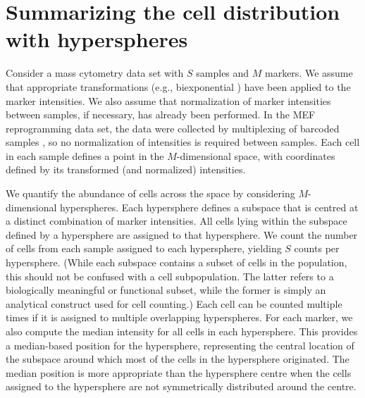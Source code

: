 \documentclass{article}
\begin{document}
\section{Summarizing the cell distribution with hyperspheres}
Consider a mass cytometry data set with $S$ samples and $M$ markers.
We assume that appropriate transformations (e.g., biexponential \cite{parks2006new}) have been applied to the marker intensities.
We also assume that normalization of marker intensities between samples, if necessary, has already been performed.
In the MEF reprogramming data set, the data were collected by multiplexing of barcoded samples \cite{zunder2015palladium}, so no normalization of intensities is required between samples.
Each cell in each sample defines a point in the $M$-dimensional space, with coordinates defined by its transformed (and normalized) intensities.

We quantify the abundance of cells across the space by considering $M$-dimensional hyperspheres.
Each hypersphere defines a subspace that is centred at a distinct combination of marker intensities.
All cells lying within the subspace defined by a hypersphere are assigned to that hypersphere.
We count the number of cells from each sample assigned to each hypersphere, yielding $S$ counts per hypersphere.
(While each subspace contains a subset of cells in the population, this should not be confused with a cell subpopulation.
The latter refers to a biologically meaningful or functional subset, while the former is simply an analytical construct used for cell counting.)
Each cell can be counted multiple times if it is assigned to multiple overlapping hyperspheres.
For each marker, we also compute the median intensity for all cells in each hypersphere.
This provides a median-based position for the hypersphere, representing the central location of the subspace around which most of the cells in the hypersphere originated.
The median position is more appropriate than the hypersphere centre when the cells assigned to the hypersphere are not symmetrically distributed around the centre.

\end{document}
